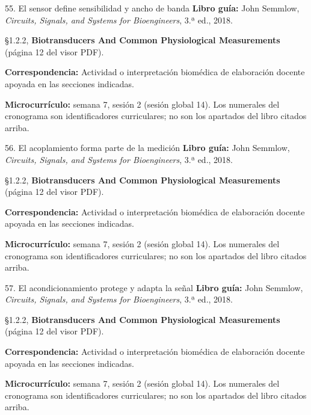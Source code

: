 \documentclass[
  10pt,
  ignorenonframetext,
  aspectratio=169,
  spanish,
]{beamer}
\begin{document}
\begin{frame}{55. El sensor define sensibilidad y ancho de banda}
\label{el-sensor-define-sensibilidad-y-ancho-de-banda}
\textbf{Libro guía:} John Semmlow, \emph{Circuits, Signals, and Systems
for Bioengineers}, 3.ª ed., 2018.

§1.2.2, \textbf{Biotransducers And Common Physiological Measurements}
(página 12 del visor PDF).

\textbf{Correspondencia:} Actividad o interpretación biomédica de
elaboración docente apoyada en las secciones indicadas.

\textbf{Microcurrículo:} semana 7, sesión 2 (sesión global 14). Los
numerales del cronograma son identificadores curriculares; no son los
apartados del libro citados arriba.
\end{frame}

\begin{frame}{56. El acoplamiento forma parte de la medición}
\label{el-acoplamiento-forma-parte-de-la-mediciuxf3n}
\textbf{Libro guía:} John Semmlow, \emph{Circuits, Signals, and Systems
for Bioengineers}, 3.ª ed., 2018.

§1.2.2, \textbf{Biotransducers And Common Physiological Measurements}
(página 12 del visor PDF).

\textbf{Correspondencia:} Actividad o interpretación biomédica de
elaboración docente apoyada en las secciones indicadas.

\textbf{Microcurrículo:} semana 7, sesión 2 (sesión global 14). Los
numerales del cronograma son identificadores curriculares; no son los
apartados del libro citados arriba.
\end{frame}

\begin{frame}{57. El acondicionamiento protege y adapta la señal}
\label{el-acondicionamiento-protege-y-adapta-la-seuxf1al}
\textbf{Libro guía:} John Semmlow, \emph{Circuits, Signals, and Systems
for Bioengineers}, 3.ª ed., 2018.

§1.2.2, \textbf{Biotransducers And Common Physiological Measurements}
(página 12 del visor PDF).

\textbf{Correspondencia:} Actividad o interpretación biomédica de
elaboración docente apoyada en las secciones indicadas.

\textbf{Microcurrículo:} semana 7, sesión 2 (sesión global 14). Los
numerales del cronograma son identificadores curriculares; no son los
apartados del libro citados arriba.
\end{frame}
\end{document}
